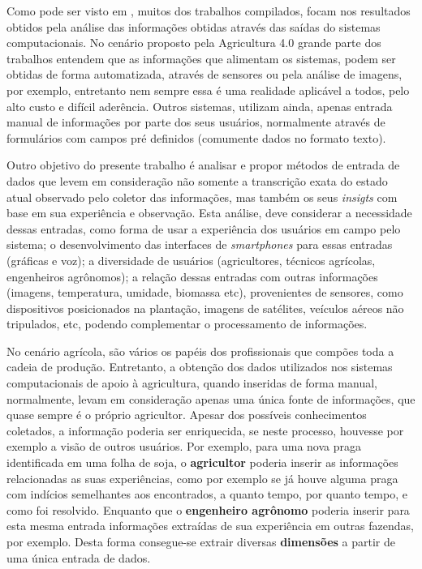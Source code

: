 \documentclass[12pt]{article}
\begin{document}
Como pode ser visto em \cite{rumo-agricultura-digital}, muitos dos trabalhos compilados, focam nos resultados obtidos pela análise das informações obtidas através das saídas do sistemas computacionais. No cenário proposto pela Agricultura 4.0 grande parte dos trabalhos entendem que as informações que alimentam os sistemas, podem ser obtidas de forma automatizada, através de sensores ou pela análise de imagens, por exemplo, entretanto nem sempre essa é uma realidade aplicável a todos, pelo alto custo e difícil aderência. Outros sistemas, utilizam ainda, apenas entrada manual de informações por parte dos seus usuários, normalmente através de formulários com campos pré definidos (comumente dados no formato texto).

Outro objetivo do presente trabalho é analisar e propor métodos de entrada de dados que levem em consideração não somente a transcrição exata do estado atual observado pelo coletor das informações, mas também os seus \textit{insigts} com base em sua experiência e observação. Esta análise, deve considerar a necessidade dessas entradas, como forma de usar a experiência dos usuários em campo pelo sistema; o desenvolvimento das interfaces de \textit{smartphones} para essas entradas (gráficas e voz); a diversidade de usuários (agricultores, técnicos agrícolas, engenheiros agrônomos); a relação dessas entradas com outras informações (imagens, temperatura, umidade, biomassa etc), provenientes de sensores, como dispositivos posicionados na plantação, imagens de satélites, veículos aéreos não tripulados, etc, podendo complementar o processamento de informações.

No cenário agrícola, são vários os papéis dos profissionais que compões toda a cadeia de produção. Entretanto, a obtenção dos dados utilizados nos sistemas computacionais de apoio à agricultura, quando inseridas de forma manual, normalmente, levam em consideração apenas uma única fonte de informações, que quase sempre é o próprio agricultor. Apesar dos possíveis conhecimentos coletados, a informação poderia ser enriquecida, se neste processo, houvesse por exemplo a visão de outros usuários. Por exemplo, para uma nova praga identificada em uma folha de soja, o \textbf{agricultor} poderia inserir as informações relacionadas as suas experiências, como por exemplo se já houve alguma praga com indícios semelhantes aos encontrados, a quanto tempo, por quanto tempo, e como foi resolvido. Enquanto que o \textbf{engenheiro agrônomo} poderia inserir para esta mesma entrada informações extraídas de sua experiência em outras fazendas, por exemplo. Desta forma consegue-se extrair diversas \textbf{dimensões} a partir de uma única entrada de dados. \cite{Walling:2020}
\end{document}

